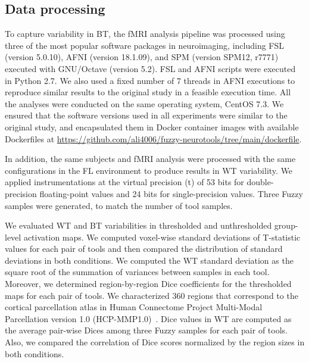 \documentclass[conference]{IEEEtran}
\begin{document}
\subsection{Data processing}

To capture variability in BT, the fMRI analysis pipeline was processed using three of the most popular software
packages in neuroimaging, including FSL (version 5.0.10), AFNI (version 18.1.09), and SPM (version SPM12, r7771)
executed with GNU/Octave (version 5.2). 
FSL and AFNI scripts were executed in Python 2.7. We also used a fixed number of 7 threads in AFNI executions
to reproduce similar results to the original study in a feasible execution time.
All the analyses were conducted on the same operating system, CentOS 7.3.
We ensured that the software versions used in all experiments were similar to the original study,
and encapsulated them in Docker container images with available Dockerfiles at \url{https://github.com/ali4006/fuzzy-neurotools/tree/main/dockerfile}.

In addition, the same subjects and fMRI analysis were processed with the same configurations in the FL environment
to produce results in WT variability.
We applied instrumentations at the virtual precision (t) of 53 bits for double-precision floating-point values
and 24 bits for single-precision values. Three Fuzzy samples were generated, to match the number of tool samples.

We evaluated WT and BT variabilities in thresholded and unthresholded group-level activation maps.
We computed voxel-wise standard deviations of T-statistic values for each pair of tools
and then compared the distribution of standard deviations in both conditions.
We computed the WT standard deviation as the square root of the summation of variances between samples in each tool.
Moreover, we determined region-by-region Dice coefficients for the thresholded maps for each pair of tools.
We characterized 360 regions that correspond to the cortical parcellation atlas
in Human Connectome Project Multi-Modal Parcellation version 1.0 (HCP-MMP1.0)~\cite{glasser2016multi}.
Dice values in WT are computed as the average pair-wise Dices among three Fuzzy samples for each pair of tools.
Also, we compared the correlation of Dice scores normalized by the region sizes in both conditions.

\end{document}
